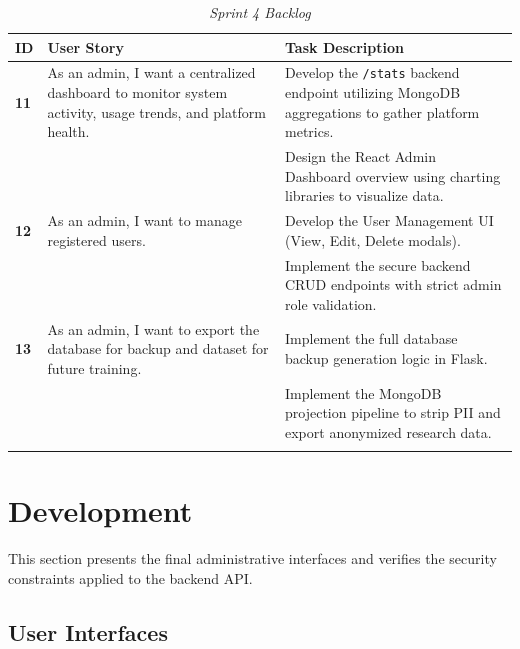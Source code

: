 {\setlength{\tabcolsep}{4pt}%
	\renewcommand{\arraystretch}{1.35}%
	\small
	\begin{longtable}{|>{\centering\arraybackslash}p{0.8cm}|>{\raggedright\arraybackslash}p{4.5cm}|>{\raggedright\arraybackslash}p{6.8cm}|}
		\hline
		\rowcolor[HTML]{1F3864}
		{\color{white}\textbf{ID}} &
		{\color{white}\textbf{User Story}} &
		{\color{white}\textbf{Task Description}} \\
		\hline
		\endfirsthead
		\hline
		\endhead
		\hline
		\endfoot
		\hline
		\endlastfoot
		
		\textbf{11} & As an admin, I want a centralized dashboard to monitor system activity, usage trends, and platform health. & Develop the \texttt{/stats} backend endpoint utilizing MongoDB aggregations to gather platform metrics. \\
		\cline{3-3}
		& & Design the React Admin Dashboard overview using charting libraries to visualize data. \\
		\hline
		
		\textbf{12} & As an admin, I want to manage registered users. & Develop the User Management UI (View, Edit, Delete modals). \\
		\cline{3-3}
		& & Implement the secure backend CRUD endpoints with strict admin role validation. \\
		\hline
		
		\textbf{13} & As an admin, I want to export the database for backup and dataset for future training. & Implement the full database backup generation logic in Flask. \\
		\cline{3-3}
		& & Implement the MongoDB projection pipeline to strip PII and export anonymized research data. \\
		\hline
		\caption{\textit{Sprint 4 Backlog}}\label{tab:sprint4_backlog}
	\end{longtable}
}

\section{Development}
This section presents the final administrative interfaces and verifies the security constraints applied to the backend API.

\subsection{User Interfaces}

